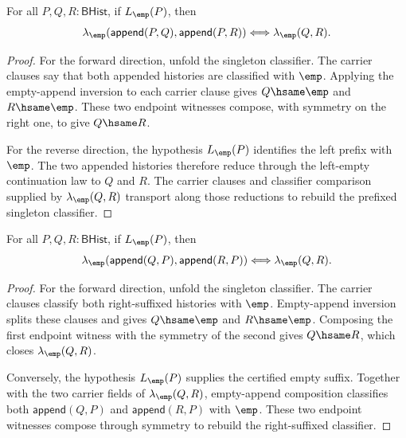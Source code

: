 \begin{theorem}
\label{thm:singleton-linearmap-classifier-append-left-cancel}
For all $P,Q,R:\mathsf{BHist}$, if $L_{\emp}(P)$, then
$$
\lambda_{\emp}(\mathsf{append}(P,Q),\mathsf{append}(P,R))
\Longleftrightarrow
\lambda_{\emp}(Q,R).
$$
\end{theorem}
\begin{proof}
For the forward direction, unfold the singleton classifier. The carrier
clauses say that both appended histories are classified with $\emp$.
Applying the empty-append inversion to each carrier clause gives
$Q\hsame\emp$ and $R\hsame\emp$. These two endpoint witnesses compose, with
symmetry on the right one, to give $Q\hsame R$.

For the reverse direction, the hypothesis $L_{\emp}(P)$ identifies the left
prefix with $\emp$. The two appended histories therefore reduce through the
left-empty continuation law to $Q$ and $R$. The carrier clauses and classifier
comparison supplied by $\lambda_{\emp}(Q,R)$ transport along those reductions
to rebuild the prefixed singleton classifier.
\end{proof}

\begin{theorem}
\label{thm:linearmap-singleton-classifier-append-right-cancel-iff}
For all $P,Q,R:\mathsf{BHist}$, if $L_{\emp}(P)$, then
$$
\lambda_{\emp}(\mathsf{append}(Q,P),\mathsf{append}(R,P))
\Longleftrightarrow
\lambda_{\emp}(Q,R).
$$
\end{theorem}
\begin{proof}
For the forward direction, unfold the singleton classifier. The carrier
clauses classify both right-suffixed histories with $\emp$. Empty-append
inversion splits these clauses and gives $Q\hsame\emp$ and $R\hsame\emp$.
Composing the first endpoint witness with the symmetry of the second gives
$Q\hsame R$, which closes $\lambda_{\emp}(Q,R)$.

Conversely, the hypothesis $L_{\emp}(P)$ supplies the certified empty suffix.
Together with the two carrier fields of $\lambda_{\emp}(Q,R)$, empty-append
composition classifies both $\mathsf{append}(Q,P)$ and
$\mathsf{append}(R,P)$ with $\emp$. These two endpoint witnesses compose
through symmetry to rebuild the right-suffixed classifier.
\end{proof}

